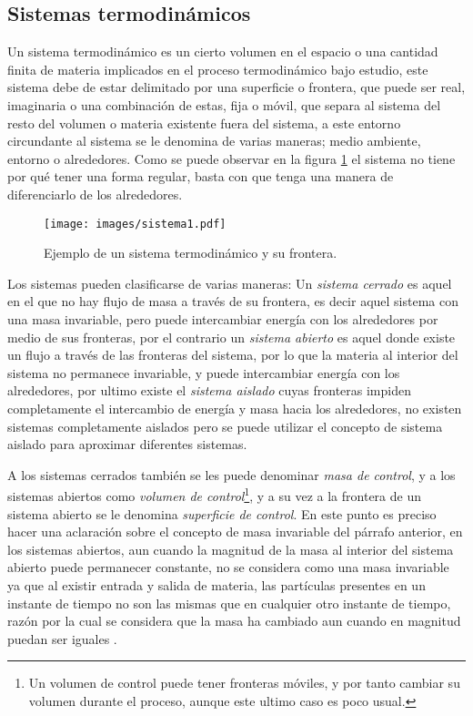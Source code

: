 \documentclass[../master.tex]{subfiles}
\begin{document}
\subsection{Sistemas termodinámicos}

Un sistema termodinámico es un cierto volumen en el espacio o una cantidad finita de materia implicados en el proceso termodinámico bajo estudio, este sistema debe de estar delimitado por una superficie o frontera, que puede ser real, imaginaria o una combinación de estas, fija o móvil, que separa al sistema del resto del volumen o materia existente fuera del sistema, a este entorno circundante al sistema se le denomina de varias maneras; medio ambiente, entorno o alrededores. Como se puede observar en la figura \ref{fig:exp_sistema} el sistema no tiene por qué tener una forma regular, basta con que tenga una manera de diferenciarlo de los alrededores.

\begin{figure}[htbp]
    \centering
    \texttt{[image: images/sistema1.pdf]}
    \caption{Ejemplo de un sistema termodinámico y su frontera.}
    \label{fig:exp_sistema}
\end{figure}

Los sistemas pueden clasificarse de varias maneras: Un \emph{sistema cerrado} es aquel en el que no hay flujo de masa a través de su frontera, es decir aquel sistema con una masa invariable, pero puede intercambiar energía con los alrededores por medio de sus fronteras, por el contrario un \emph{sistema abierto} es aquel donde existe un flujo a través de las fronteras del sistema, por lo que la materia al interior del sistema no permanece invariable, y puede intercambiar energía con los alrededores, por ultimo existe el \emph{sistema aislado} cuyas fronteras impiden completamente el intercambio de energía y masa hacia los alrededores, no existen sistemas completamente aislados pero se puede utilizar el concepto de sistema aislado para aproximar diferentes sistemas.

A los sistemas cerrados también se les puede denominar \emph{masa de control}, y a los sistemas abiertos como \emph{volumen de control}\footnote{Un volumen de control puede tener fronteras móviles, y por tanto cambiar su volumen durante el proceso, aunque este ultimo caso es poco usual.}, y a su vez a la frontera de un sistema abierto se le denomina \emph{superficie de control}. En este punto es preciso hacer una aclaración sobre el concepto de masa invariable del párrafo anterior, en los sistemas abiertos, aun cuando la magnitud de la masa al interior del sistema abierto puede permanecer constante, no se considera como una masa invariable ya que al existir entrada y salida de materia, las partículas presentes en un instante de tiempo no son las mismas que en cualquier otro instante de tiempo, razón por la cual se considera que la masa ha cambiado aun cuando en magnitud puedan ser iguales \parencites{clavell}{faires}{wark}.
\end{document}
